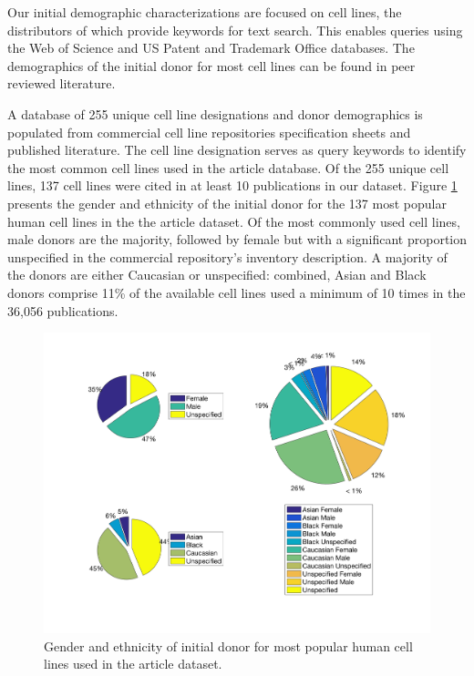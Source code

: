 \documentclass[10pt]{article}
\begin{document}
Our initial demographic characterizations are focused on cell lines, the distributors of which provide keywords for text search. This enables queries using the Web of Science and US Patent and Trademark Office databases. The demographics of the initial donor for most cell lines can be found in peer reviewed literature.

A database of 255 unique cell line designations and donor demographics is populated from commercial cell line repositories specification sheets and published literature. The cell line designation serves as query keywords to identify the most common cell lines used in the article database. Of the 255 unique cell lines, 137 cell lines were cited in at least 10 publications in our dataset. Figure \ref{pc3} presents the gender and ethnicity of the initial donor for the 137 most popular human cell lines in the the article dataset. Of the most commonly used cell lines, male donors are the majority, followed by female but with a significant proportion unspecified in the commercial repository's inventory description. A majority of the donors are either Caucasian or unspecified: combined, Asian and Black donors comprise 11\% of the available cell lines used a minimum of 10 times in the 36,056 publications.

\begin{figure}[h!]
\centering
\includegraphics[width=0.98\columnwidth]{Figures/PieChart_3}
\caption{\label{pc3}Gender and ethnicity of initial donor for most popular human cell lines used in the article dataset.}
\end{figure}
\end{document}
